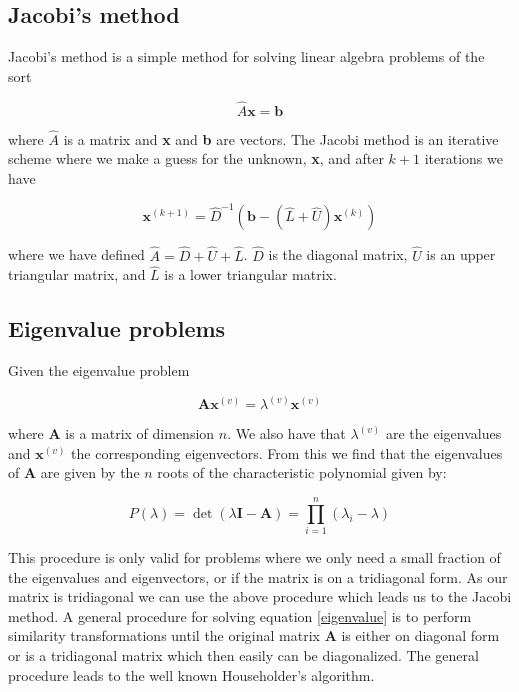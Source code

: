 \documentclass[a4paper, fontsize=11pt]{article}
\begin{document}
\subsection{Jacobi's method}
Jacobi's method is a simple method for solving linear algebra problems of the sort

\begin{equation}
\hat{A} \textbf{x} = \textbf{b}
\end{equation}

where $\hat{A}$ is a matrix and \textbf{x} and \textbf{b} are vectors. The Jacobi method is an iterative scheme where we make a guess for the unknown, \textbf{x}, and after $k+1$ iterations we have

\begin{equation}
\textbf{x}^{(k+1)}=\hat{D}^{-1}(\textbf{b} - (\hat{L} + \hat{U}) \textbf{x}^{(k)})
\end{equation} 

where we have defined $\hat{A} = \hat{D} + \hat{U} + \hat{L}$. $\hat{D}$ is the diagonal matrix, $\hat{U}$ is an upper triangular matrix, and $\hat{L}$ is a lower triangular matrix.\cite{Jensen} 

\subsection{Eigenvalue problems}
Given the eigenvalue problem 

\begin{equation} \label{eigenvalue}
\textbf{A}\textbf{x}^{(v)}=\lambda^{(v)}\textbf{x}^{(v)}
\end{equation}

where \textbf{A} is a matrix of dimension $n$. We also have that $\lambda^{(v)}$ are the eigenvalues and $\textbf{x}^{(v)}$ the corresponding eigenvectors. From this we find that the eigenvalues of \textbf{A} are given by the $n$ roots of the characteristic polynomial given by:

\begin{equation}
P(\lambda)=\det(\lambda \textbf{I} - \textbf{A}) = \prod^{n}_{i=1}(\lambda_{i} - \lambda)
\end{equation}

This procedure is only valid for problems where we only need a small fraction of the eigenvalues and eigenvectors, or if the matrix is on a tridiagonal form. As our matrix is tridiagonal we can use the above procedure which leads us to the Jacobi method. A general procedure for solving equation \eqref{eigenvalue} is to perform similarity transformations until the original matrix \textbf{A} is either on diagonal form or is a tridiagonal matrix which then easily can be diagonalized. The general procedure leads to the well known Householder's algorithm.\cite{Jensen}
\end{document}
